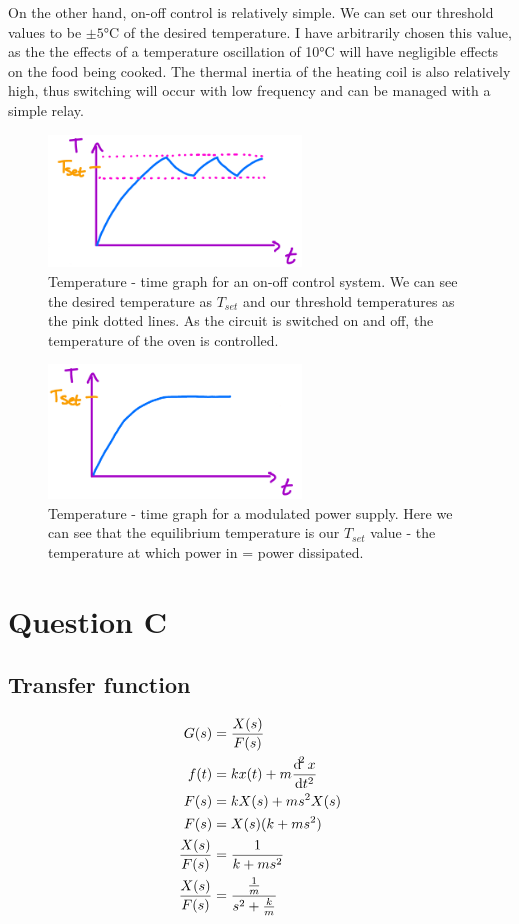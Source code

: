\documentclass[12pt]{article}
\numberwithin{equation}{section}
\begin{document}
On the other hand, on-off control is relatively simple. We can set our threshold values to be $\pm 5\si{\celsius}$ of the desired temperature. I have arbitrarily chosen this value, as the the effects of a temperature oscillation of 10\si{\celsius} will have negligible effects on the food being cooked. The thermal inertia of the heating coil is also relatively high, thus switching will occur with low frequency and can be managed with a simple relay.
\begin{figure}[H]
  \centering
  \includegraphics[width=0.6\textwidth]{./img/2-2graph.png}
  \caption{Temperature - time graph for an on-off control system. We can see the desired temperature as $T_{set}$ and our threshold temperatures as the pink dotted lines. As the circuit is switched on and off, the temperature of the oven is controlled.}
\end{figure}
\begin{figure}[H]
  \centering
  \includegraphics[width=0.6\textwidth]{./img/2-3graph.png}
  \caption{Temperature - time graph for a modulated power supply. Here we can see that the equilibrium temperature is our $T_{set}$ value - the temperature at which power in = power dissipated.}
\end{figure}
\section{Question C}
\subsection*{Transfer function}
\begin{align}
  G(s) &= \frac{X(s)}{F(s)}\\
  f(t) &= kx(t) + m \frac{\dif ^2 x}{\dif t^2}\\
  F(s) &= kX(s) + ms^2 X(s)\\
  F(s) &= X(s) (k + ms^2)\\
  \frac{X(s)}{F(s)} &= \frac{1}{k + ms^2}\\
  \frac{X(s)}{F(s)} &= \frac{\frac{1}{m}}{s^2 + \frac{k}{m}}
\end{align}
\end{document}
